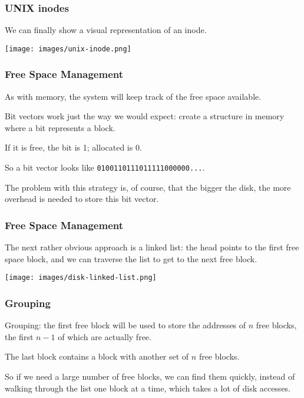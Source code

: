 \begin{frame}
\frametitle{UNIX inodes}

We can finally show a visual representation of an inode.

\begin{center}
	\texttt{[image: images/unix-inode.png]}
\end{center}


\end{frame}

\begin{frame}
\frametitle{Free Space Management}

As with memory, the system will keep track of the free space available.

Bit vectors work just the way we would expect: create a structure in memory where a bit represents a block. 

If it is free, the bit is 1; allocated is 0. 

So a bit vector looks like \texttt{0100110111011111000000...}. 

The problem with this strategy is, of course, that the bigger the disk, the more overhead is needed to store this bit vector.

\end{frame}

\begin{frame}
\frametitle{Free Space Management}

The next rather obvious approach is a linked list: the head points to the first free space block, and we can traverse the list to get to the next free block. 

\begin{center}
	\texttt{[image: images/disk-linked-list.png]}
\end{center}


\end{frame}

\begin{frame}
\frametitle{Grouping}

Grouping: the first free block will be used to store the addresses of $n$ free blocks, the first $n-1$ of which are actually free. 

The last block contains a block with another set of $n$ free blocks. 

So if we need a large number of free blocks, we can find them quickly, instead of walking through the list one block at a time, which takes a lot of disk accesses. 

\end{frame}

